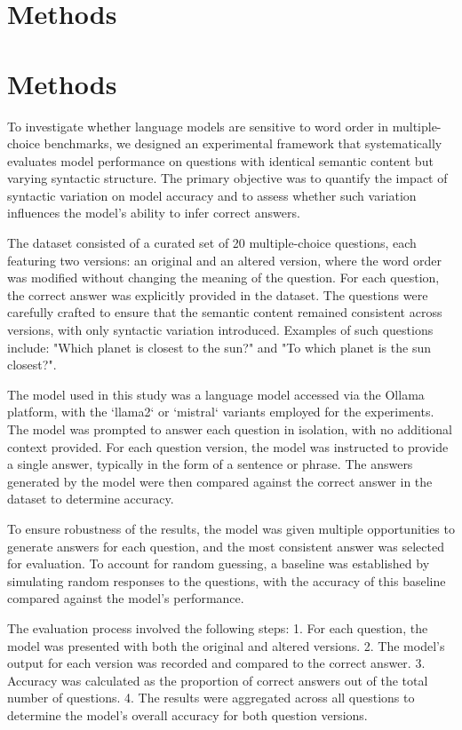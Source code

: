 \documentclass{article}
\begin{document}
\section{Methods}
\section{Methods}

To investigate whether language models are sensitive to word order in multiple-choice benchmarks, we designed an experimental framework that systematically evaluates model performance on questions with identical semantic content but varying syntactic structure. The primary objective was to quantify the impact of syntactic variation on model accuracy and to assess whether such variation influences the model’s ability to infer correct answers.

The dataset consisted of a curated set of 20 multiple-choice questions, each featuring two versions: an original and an altered version, where the word order was modified without changing the meaning of the question. For each question, the correct answer was explicitly provided in the dataset. The questions were carefully crafted to ensure that the semantic content remained consistent across versions, with only syntactic variation introduced. Examples of such questions include: "Which planet is closest to the sun?" and "To which planet is the sun closest?".

The model used in this study was a language model accessed via the Ollama platform, with the `llama2` or `mistral` variants employed for the experiments. The model was prompted to answer each question in isolation, with no additional context provided. For each question version, the model was instructed to provide a single answer, typically in the form of a sentence or phrase. The answers generated by the model were then compared against the correct answer in the dataset to determine accuracy.

To ensure robustness of the results, the model was given multiple opportunities to generate answers for each question, and the most consistent answer was selected for evaluation. To account for random guessing, a baseline was established by simulating random responses to the questions, with the accuracy of this baseline compared against the model’s performance.

The evaluation process involved the following steps:
1. For each question, the model was presented with both the original and altered versions.
2. The model’s output for each version was recorded and compared to the correct answer.
3. Accuracy was calculated as the proportion of correct answers out of the total number of questions.
4. The results were aggregated across all questions to determine the model’s overall accuracy for both question versions.
\end{document}
